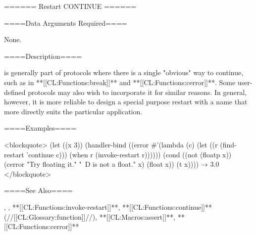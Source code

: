 ====== Restart CONTINUE ======

====Data Arguments Required====

None.

====Description====

 is generally part of protocols where there is a single "obvious" way to continue, such as in **[[CL:Functions:break]]** and **[[CL:Functions:cerror]]**. Some user-defined protocols may also wish to incorporate it for similar reasons. In general, however, it is more reliable to design a special purpose restart with a name that more directly suits the particular application.

====Examples====

<blockquote> (let ((x 3)) (handler-bind ((error #'(lambda (c) (let ((r (find-restart 'continue c))) (when r (invoke-restart r)))))) (cond ((not (floatp x)) (cerror "Try floating it." "~D is not a float." x) (float x)) (t x)))) → 3.0 </blockquote>

====See Also====

\secref\Restarts, {\secref\InterfacesToRestarts}, **[[CL:Functions:invoke-restart]]**, **[[CL:Functions:continue]]** (//[[CL:Glossary:function]]//), **[[CL:Macros:assert]]**, **[[CL:Functions:cerror]]**

